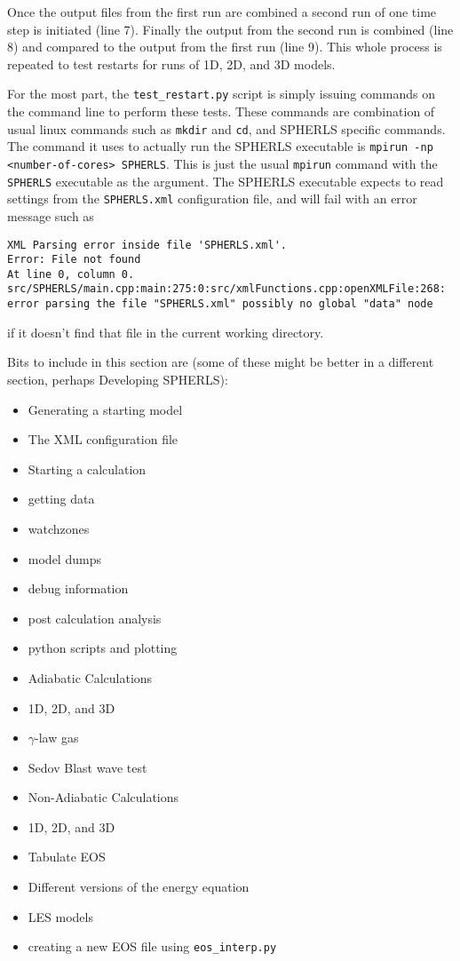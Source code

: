 \documentclass[12pt,a4paper]{book}
\begin{document}
Once the output files from the first run are combined a second run of one time step is initiated (line 7). Finally the output from the second run is combined (line 8) and compared to the output from the first run (line 9). This whole process is repeated to test restarts for runs of 1D, 2D, and 3D models.

For the most part, the {\tt test\_restart.py} script is simply issuing commands on the command line to perform these tests. These commands are combination of usual linux commands such as {\tt mkdir} and {\tt cd}, and SPHERLS specific commands. The command it uses to actually run the SPHERLS executable is {\tt mpirun -np <number-of-cores> SPHERLS}. This is just the usual {\tt mpirun} command with the {\tt SPHERLS} executable as the argument. The SPHERLS executable expects to read settings from the {\tt SPHERLS.xml} configuration file, and will fail with an error message such as 

{\tiny
\begin{verbatim}
XML Parsing error inside file 'SPHERLS.xml'.
Error: File not found
At line 0, column 0.
src/SPHERLS/main.cpp:main:275:0:src/xmlFunctions.cpp:openXMLFile:268: error parsing the file "SPHERLS.xml" possibly no global "data" node
\end{verbatim}
}

if it doesn't find that file in the current working directory.


Bits to include in this section are (some of these might be better in a different section, perhaps Developing SPHERLS):
\begin{itemize}
\item Generating a starting model
\item The XML configuration file
\item Starting a calculation
\item getting data
\item watchzones
\item model dumps
\item debug information
\item post calculation analysis
\item python scripts and plotting
\item Adiabatic Calculations
\item 1D, 2D, and 3D
\item $\gamma$-law gas
\item Sedov Blast wave test
\item Non-Adiabatic Calculations
\item 1D, 2D, and 3D
\item Tabulate EOS
\item Different versions of the energy equation
\item LES models
\item creating a new EOS file using {\tt eos\_interp.py}
\end{itemize}
\end{document}
